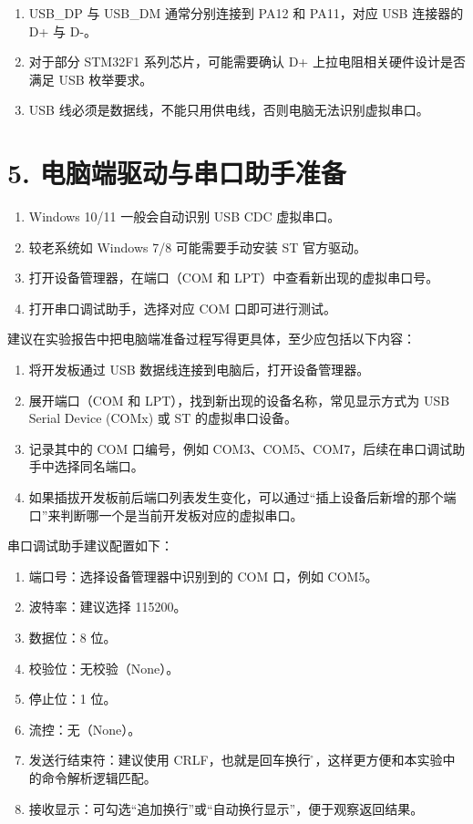 \documentclass[
  chinese,
  UTF8,
  oneside,
  openany]{ctexbook}
\providecommand{\tightlist}{%
  \setlength{\itemsep}{0pt}\setlength{\parskip}{0pt}}
\begin{document}
\begin{enumerate}
\def\labelenumi{\arabic{enumi}.}
\tightlist
\item
  USB\_DP 与 USB\_DM 通常分别连接到 PA12 和 PA11，对应 USB 连接器的 D+
  与 D-。
\item
  对于部分 STM32F1 系列芯片，可能需要确认 D+
  上拉电阻相关硬件设计是否满足 USB 枚举要求。
\item
  USB 线必须是数据线，不能只用供电线，否则电脑无法识别虚拟串口。
\end{enumerate}

\section{5.
电脑端驱动与串口助手准备}\label{ux7535ux8111ux7aefux9a71ux52a8ux4e0eux4e32ux53e3ux52a9ux624bux51c6ux5907}

\begin{enumerate}
\def\labelenumi{\arabic{enumi}.}
\tightlist
\item
  Windows 10/11 一般会自动识别 USB CDC 虚拟串口。
\item
  较老系统如 Windows 7/8 可能需要手动安装 ST 官方驱动。
\item
  打开设备管理器，在端口（COM 和 LPT）中查看新出现的虚拟串口号。
\item
  打开串口调试助手，选择对应 COM 口即可进行测试。
\end{enumerate}

建议在实验报告中把电脑端准备过程写得更具体，至少应包括以下内容：

\begin{enumerate}
\def\labelenumi{\arabic{enumi}.}
\tightlist
\item
  将开发板通过 USB 数据线连接到电脑后，打开设备管理器。
\item
  展开端口（COM 和 LPT），找到新出现的设备名称，常见显示方式为 USB
  Serial Device (COMx) 或 ST 的虚拟串口设备。
\item
  记录其中的 COM 口编号，例如
  COM3、COM5、COM7，后续在串口调试助手中选择同名端口。
\item
  如果插拔开发板前后端口列表发生变化，可以通过``插上设备后新增的那个端口''来判断哪一个是当前开发板对应的虚拟串口。
\end{enumerate}

串口调试助手建议配置如下：

\begin{enumerate}
\def\labelenumi{\arabic{enumi}.}
\tightlist
\item
  端口号：选择设备管理器中识别到的 COM 口，例如 COM5。
\item
  波特率：建议选择 115200。
\item
  数据位：8 位。
\item
  校验位：无校验（None）。
\item
  停止位：1 位。
\item
  流控：无（None）。
\item
  发送行结束符：建议使用 CRLF，也就是回车换行
  \r\n，这样更方便和本实验中的命令解析逻辑匹配。
\item
  接收显示：可勾选``追加换行''或``自动换行显示''，便于观察返回结果。
\end{enumerate}
\end{document}
